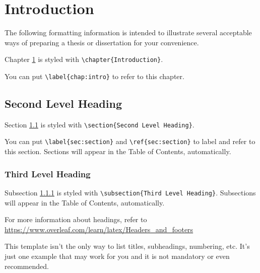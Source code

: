 \documentclass[11pt]{report}
\begin{document}

\chapter{Introduction}\label{chap:intro}
The following formatting information is intended to illustrate several acceptable ways of preparing a thesis or dissertation for your convenience.

Chapter \ref{chap:intro} is styled with \verb|\chapter{Introduction}|. \par
You can put \verb|\label{chap:intro}| to refer to this chapter.

\section{Second Level Heading}\label{sec:section}

Section \ref{sec:section} is styled with \verb|\section{Second Level Heading}|. \par
You can put \verb|\label{sec:section}| and \verb|\ref{sec:section}| to label and refer to this section.
Sections will appear in the Table of Contents, automatically.

%
\subsection{Third Level Heading}\label{subs:subsection}
Subsection \ref{subs:subsection} is styled with \verb|\subsection{Third Level Heading}|.
Subsections will appear in the Table of Contents, automatically.

For more information about headings, refer to \url{https://www.overleaf.com/learn/latex/Headers_and_footers}

This template isn’t the only way to list titles, subheadings, numbering, etc.
It’s just one example that may work for you and it is not mandatory or even recommended.
\end{document}
